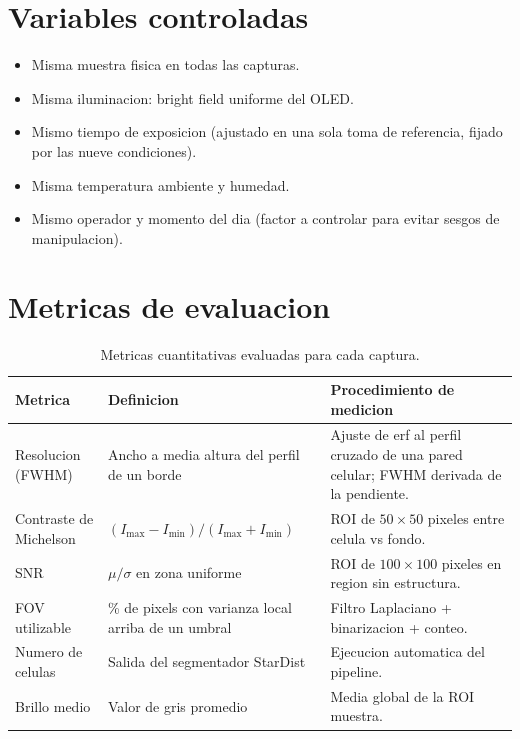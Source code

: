 \documentclass[11pt,a4paper,oneside]{report}
\begin{document}
\section{Variables controladas}

\begin{itemize}[leftmargin=2.2em]
  \item Misma muestra fisica en todas las capturas.
  \item Misma iluminacion: bright field uniforme del OLED.
  \item Mismo tiempo de exposicion (ajustado en una sola toma de
        referencia, fijado por las nueve condiciones).
  \item Misma temperatura ambiente y humedad.
  \item Mismo operador y momento del dia (factor a controlar para evitar
        sesgos de manipulacion).
\end{itemize}

\section{Metricas de evaluacion}

\begin{table}[h!]
\centering
\caption{Metricas cuantitativas evaluadas para cada captura.}
\renewcommand{\arraystretch}{1.4}
\small
\begin{tabular}{p{2.7cm}p{4.2cm}p{6.5cm}}
\toprule
\textbf{Metrica} & \textbf{Definicion} & \textbf{Procedimiento de medicion} \\
\midrule
Resolucion (FWHM) &
Ancho a media altura del perfil de un borde &
Ajuste de erf al perfil cruzado de una pared celular; FWHM derivada de la pendiente. \\
Contraste de Michelson &
$(I_{\max}{-}I_{\min}) / (I_{\max}{+}I_{\min})$ &
ROI de $50\times 50$ pixeles entre celula vs fondo. \\
SNR &
$\mu / \sigma$ en zona uniforme &
ROI de $100\times 100$ pixeles en region sin estructura. \\
FOV utilizable &
\% de pixels con varianza local arriba de un umbral &
Filtro Laplaciano + binarizacion + conteo. \\
Numero de celulas &
Salida del segmentador StarDist &
Ejecucion automatica del pipeline. \\
Brillo medio &
Valor de gris promedio &
Media global de la ROI muestra. \\
\bottomrule
\end{tabular}
\label{tab:metricas}
\end{table}
\end{document}
